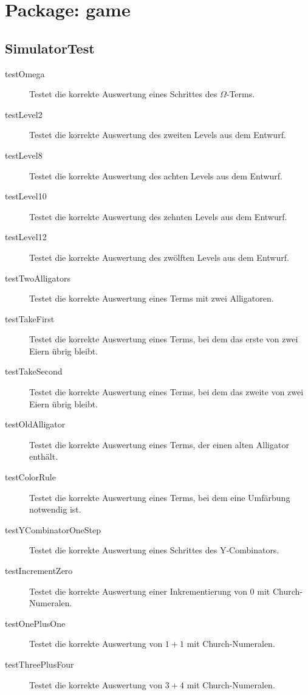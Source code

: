 \section{Package: game}

\subsection{SimulatorTest}

\begin{description}
\item[testOmega]
Testet die korrekte Auswertung eines Schrittes des \(\Omega\)-Terms.

\item[testLevel2]
Testet die korrekte Auswertung des zweiten Levels aus dem Entwurf.

\item[testLevel8]
Testet die korrekte Auswertung des achten Levels aus dem Entwurf.

\item[testLevel10]
Testet die korrekte Auswertung des zehnten Levels aus dem Entwurf.

\item[testLevel12]
Testet die korrekte Auswertung des zwölften Levels aus dem Entwurf.

\item[testTwoAlligators]
Testet die korrekte Auswertung eines Terms mit zwei Alligatoren.

\item[testTakeFirst]
Testet die korrekte Auswertung eines Terms, bei dem das erste von zwei Eiern übrig bleibt.

\item[testTakeSecond]
Testet die korrekte Auswertung eines Terms, bei dem das zweite von zwei Eiern übrig bleibt.

\item[testOldAlligator]
Testet die korrekte Auswertung eines Terms, der einen alten Alligator enthält.

\item[testColorRule]
Testet die korrekte Auswertung eines Terms, bei dem eine Umfärbung notwendig ist.

\item[testYCombinatorOneStep]
Testet die korrekte Auswertung eines Schrittes des Y-Combinators.

\item[testIncrementZero]
Testet die korrekte Auswertung einer Inkrementierung von 0 mit Church-Numeralen.

\item[testOnePlusOne]
Testet die korrekte Auswertung von \(1+ 1\) mit Church-Numeralen.

\item[testThreePlusFour]
Testet die korrekte Auswertung von \(3 + 4\) mit Church-Numeralen.

\end{description}
